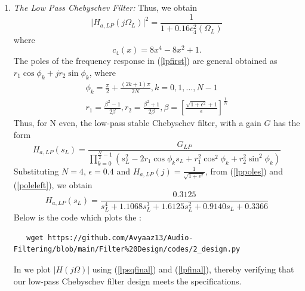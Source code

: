 \documentclass[article]{IEEEtran}
\theoremstyle{remark}
\numberwithin{equation}{subsection}
\begin{document}
\begin{enumerate}
\item {\em The Low Pass Chebyschev Filter:} Thus, we obtain
\begin{equation}
\label{lpsqfinal}
\vert H_{a,LP}(j\Omega_L)\vert^2 = \frac{1}{1 + 0.16c_4^2(\Omega_L)}
\end{equation}
where
\begin{equation}
c_4(x) = 8x^4 - 8x^2 + 1.	
\end{equation}
The poles of the frequency response in (\ref{lpfirst}) are general obtained as 
$r_1\cos\phi_k + jr_2\sin \phi_k$, where
\begin{eqnarray}
\label{lppoles}
\phi_k = \frac{\pi}{2} + \frac{(2k+1)\pi}{2N}, k = 0, 1, \dots, N-1 \nonumber \\
r_1 = \frac{\beta^2 - 1}{2\beta}, r_2 = \frac{\beta^2 + 1}{2\beta}, \beta = \left[ \frac{\sqrt{1 + \epsilon^2} + 1}{\epsilon}\right]^{\frac{1}{N}}
\end{eqnarray}
Thus, for N even, the low-pass stable Chebyschev filter, with a gain $G$ has the form
\begin{equation}
\label{poleleft}
H_{a,LP}(s_L) = \frac{G_{LP}}{\prod_{k = 0}^{\frac{N}{2}-1}(s_L^2 - 2r_1\cos\phi_ks_L + r_1^2\cos^2\phi_k + r_2^2 \sin^2\phi_k)}
\end{equation}
Substituting $N = 4$, $\epsilon = 0.4$ and $H_{a,LP}(j) = \frac{1}{\sqrt{1+\epsilon^2}}$, from (\ref{lppoles}) and (\ref{poleleft}), we obtain 
\begin{equation}
\label{lpfinal}
H_{a,LP}(s_L) = \frac{0.3125}{s_L^4 + 1.1068s_L^3 + 1.6125s_L^2+0.9140s_L + 0.3366}
\end{equation}
Below is the code which plots the :
\begin{lstlisting}
   wget https://github.com/Avyaaz13/Audio-Filtering/blob/main/Filter%20Design/codes/2_design.py
\end{lstlisting}
In  we plot $|H(j\Omega)|$ using (\ref{lpsqfinal}) and (\ref{lpfinal}), thereby verifying that our low-pass Chebyschev filter design meets the specifications.


\end{enumerate}
\end{document}

